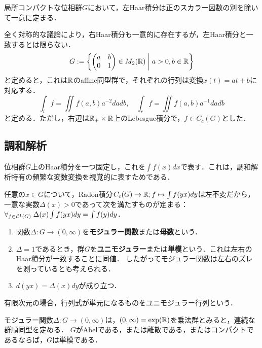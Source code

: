 \documentclass[uplatex,dvipdfmx]{jsreport}
\begin{document}
\begin{theorem}[Haar]
    局所コンパクトな位相群$G$において，左Haar積分は正のスカラー因数の別を除いて一意に定まる．
\end{theorem}
\begin{remark}
    全く対称的な議論により，右Haar積分も一意的に存在するが，左Haar積分と一致するとは限らない．
    \[G:=\left\{\begin{pmatrix}a&b\\0&1\end{pmatrix}\in M_2(\mathbb{R})\;\middle|\;a>0,b\in\mathbb{R}\right\}\]
    と定めると，これは$\mathbb{R}$のaffine同型群で，それぞれの行列は変換$x(t)=at+b$に対応する．
    \[\int_lf=\iint f(a,b)a^{-2}dadb,\quad\int_rf=\iint f(a,b)a^{-1}dadb\]
    と定める．ただし，右辺は$\mathbb{R}_+\times\mathbb{R}$上のLebesgue積分で，$f\in C_c(G)$とした．
\end{remark}

\subsection{調和解析}

\begin{notation}
    位相群$G$上のHaar積分を一つ固定し，これを$\int f(x)dx$で表す．これは，調和解析特有の頻繁な変数変換を視覚的に表すためである．
\end{notation}

\begin{definition}
    任意の$x\in G$について，Radon積分$C_c(G)\to\mathbb{R};f\mapsto\int f(yx)dy$は左不変だから，一意な実数$\Delta(x)>0$であって次を満たすものが定まる：$\forall_{f\in\mathcal{L}^1(G)}\;\Delta(x)\int f(yx)dy=\int f(y)dy$．
    \begin{enumerate}
        \item 関数$\Delta:G\to(0,\infty)$を\textbf{モジュラー関数}または\textbf{母数}という．
        \item $\Delta=1$であるとき，群$G$を\textbf{ユニモジュラー}または\textbf{単模}という．これは左右のHaar積分が一致することに同値．
    したがってモジュラー関数は左右のズレを測っているとも考えられる．
    \item $d(yx)=\Delta(x)dy$が成り立つ．
    \end{enumerate}
\end{definition}
\begin{remark}
    有限次元の場合，行列式が単元になるものをユニモジュラー行列という．
\end{remark}

\begin{proposition}
    モジュラー関数$\Delta:G\to(0,\infty)$は，$(0,\infty)=\exp(\mathbb{R})$を乗法群とみると，連続な群順同型を定める．
    $G$がAbelである，または離散である，またはコンパクトであるならば，$G$は単模である．
\end{proposition}
\end{document}
